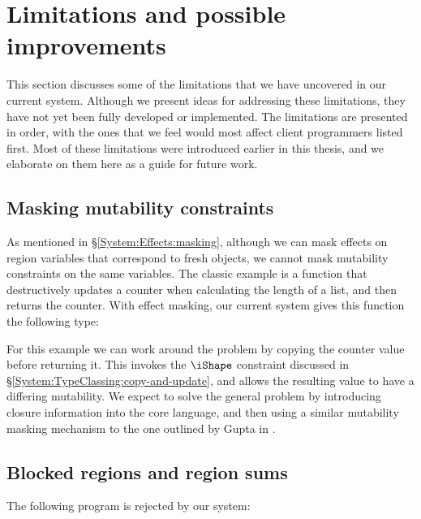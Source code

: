 
\section{Limitations and possible improvements}

This section discusses some of the limitations that we have uncovered in our current system. Although we present ideas for addressing these limitations, they have not yet been fully developed or implemented. The limitations are presented in order, with the ones that we feel would most affect client programmers listed first. Most of these limitations were introduced earlier in this thesis, and we elaborate on them here as a guide for future work.


\subsection{Masking mutability constraints}
\label{Evaluation:Limitations:mutability-masking}

As mentioned in \S\ref{System:Effects:masking}, although we can mask effects on region variables that correspond to fresh objects, we cannot mask mutability constraints on the same variables. The classic example is a function that destructively updates a counter when calculating the length of a list, and then returns the counter. With effect masking, our current system gives this function the following type:


For this example we can work around the problem by copying the counter value before returning it. This invokes the $\iShape$ constraint discussed in \S\ref{System:TypeClassing:copy-and-update}, and allows the resulting value to have a differing mutability. We expect to solve the general problem by introducing closure information into the core language, and then using a similar mutability masking mechanism to the one outlined by Gupta in \cite{gupta:functional-encapsulation}.

\clearpage{}
\subsection{Blocked regions and region sums}
\label{Evaluation:Limitations:blocked-regions}

The following program is rejected by our system:

